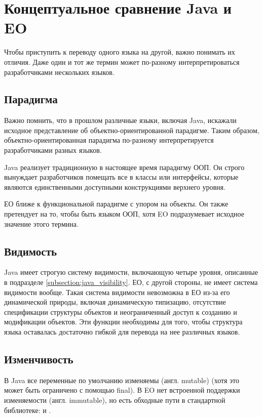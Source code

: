 \documentclass[oneside,final,14pt,a4paper]{extreport}
\theoremstyle{definition}
\theoremstyle{remark}
\theoremstyle{remark}
\begin{document}
\section{Концептуальное сравнение Java и EO}
\label{section:conceptual_comparison}

Чтобы приступить к переводу одного языка на другой, важно понимать их отличия. Даже один и тот же термин может по-разному интерпретироваться разработчиками нескольких языков.

\subsection{Парадигма}

Важно помнить, что в прошлом различные языки, включая Java, искажали исходное представление об объектно-ориентированной парадигме. Таким образом, объектно-ориентированная парадигма по-разному интерпретируется разработчиками разных языков.

Java реализует традиционную в настоящее время парадигму ООП. Он строго вынуждает разработчиков помещать все в классы или интерфейсы, которые являются единственными доступными конструкциями верхнего уровня.

ЕО ближе к функциональной парадигме с упором на объекты. Он также претендует на то, чтобы быть языком ООП, хотя EO подразумевает исходное значение этого термина.

\subsection{Видимость}
Java имеет строгую систему видимости, включающую четыре уровня, описанные в
подразделе \ref{subsection:java_visibility}. ЕО, с другой стороны, не имеет
система видимости вообще. Такая система видимости невозможна в ЕО из-за его динамической природы, включая динамическую типизацию, отсутствие спецификации структуры объектов и неограниченный доступ к созданию и модификации объектов.
Эти функции необходимы для того, чтобы структура языка оставалась достаточно гибкой для перевода на нее различных языков.


\subsection{Изменчивость}
В Java все переменные по умолчанию изменяемы (англ. mutable) (хотя это может быть ограничено с помощью final). В EO нет встроенной поддержки изменяемости (англ. immutable), но есть обходные пути в стандартной библиотеке:  и .
\end{document}
